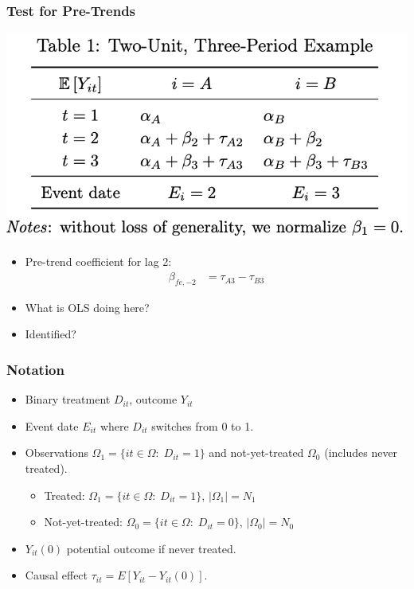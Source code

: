 \documentclass[english,xcolor=svgnames]{beamer}
\begin{document}
\begin{frame}
\frametitle[alignment=center]{Test for Pre-Trends}
\begin{center}
	\includegraphics[scale=0.5]{figures/BJSTAB1.png}
\end{center}
\begin{itemize}
	\item Pre-trend coefficient for lag 2:
	\begin{align*}
		\beta_{fe,-2} &= \tau_{A3} - \tau_{B3}
	\end{align*}
	\item What is OLS doing here?
	\item Identified?
\end{itemize}
\end{frame}

\begin{frame}
\frametitle[alignment=center]{Notation}
\begin{itemize}
	\item Binary treatment $D_{it}$, outcome $Y_{it}$
	\item Event date $E_{it}$ where $D_{it}$ switches from 0 to 1.
	\item Observations $\Omega_1=\{it\in \Omega:\; D_{it}=1\}$ and not-yet-treated $\Omega_0$ (includes never treated). 
	\begin{itemize}
		\item Treated: $\Omega_1=\{it\in \Omega:\; D_{it}=1\}$, $|\Omega_1|=N_1$
		\item Not-yet-treated: $\Omega_0=\{it\in \Omega:\; D_{it}=0\}$, $|\Omega_0|=N_0$
	\end{itemize}
	\item $Y_{it}(0)$ potential outcome if never treated.
	\item Causal effect $\tau_{it}=E[Y_{it}-Y_{it}(0)]$.
\end{itemize}
\end{frame}
\end{document}
